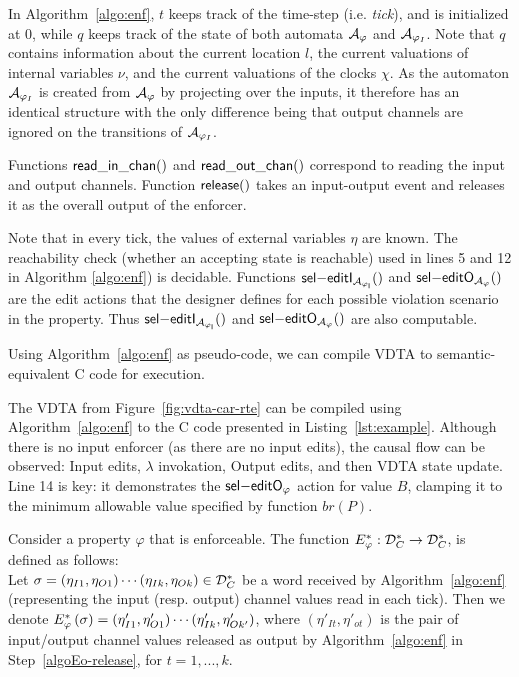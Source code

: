 In Algorithm~\ref{algo:enf}, $t$ keeps track of the time-step (i.e. \emph{tick}), and is initialized at 0, while $q$ keeps track of the state of both automata ${\mathcal A}_{\varphi}$ and ${\mathcal A}_{\varphi_I}$.
Note that $q$ contains information about the current location $l$, the current valuations of internal variables $\nu$, and the current valuations of the clocks $\chi$.
As the automaton ${\mathcal A}_{\varphi_I}$ is created from ${\mathcal A}_{\varphi}$ by projecting over the inputs, it therefore has an identical structure with the only difference being that output channels are ignored on the transitions of ${\mathcal A}_{\varphi_I}$.

Functions $\mathsf{read\_in\_chan}()$ and $\mathsf{read\_out\_chan}()$ correspond to reading the input and output channels.
Function $\mathsf{release}()$ takes an input-output event and releases it as the overall output of the enforcer.

\begin{remark}
	Note that in every tick, the values of external variables $\eta$ are known. 
	The reachability check (whether an accepting state is reachable) used in lines 5 and 12 in Algorithm \ref{algo:enf}) is decidable.   
	Functions $\mathsf{{sel}\relax{-} editI_{{\mathcal A}_{\varphi_{I}}}}()$ and $\mathsf{{sel}\relax{-} editO_{{\mathcal A}_\varphi}}()$ are the edit actions that the designer defines for each possible violation scenario in the property. Thus $\mathsf{{sel}\relax{-} editI_{{\mathcal A}_{\varphi_{I}}}}()$ and $\mathsf{{sel}\relax{-} editO_{{\mathcal A}_\varphi}}()$ are also computable.   
\end{remark}



Using Algorithm~\ref{algo:enf} as pseudo-code, we can compile \ac{VDTA} to semantic-equivalent C code for execution.


\begin{example}
	The \ac{VDTA} from Figure~\ref{fig:vdta-car-rte} can be compiled using Algorithm~\ref{algo:enf} to the C code presented in Listing~\ref{lst:example}.
	Although there is no input enforcer (as there are no input edits), the causal flow can be observed: Input edits, $\lambda$ invokation, Output edits, and then \ac{VDTA} state update.
	Line 14 is key: it demonstrates the $\mathsf{{sel}\relax{-} editO_{\varphi}}$ action for value $B$, clamping it to the minimum allowable value specified by function $br\left(P\right)$.
\end{example}

\begin{definition}[$\efalgo$]
	\label{def-algo-ef}
	Consider a property $\varphi$ that is enforceable. 
	The function ${E_{\varphi}^*}:{\mathcal D}_C^*\to{\mathcal D}_C^*$,  is defined as follows:\\
	Let $\sigma = \left(\eta_{I1}, \eta_{O1}\right) \cdots \left(\eta_{Ik}, \eta_{Ok}\right)\in{\mathcal D}_C^*$ be a word received by
	Algorithm~\ref{algo:enf} (representing the input (resp. output) channel values read in each tick). Then we denote
	${E_{\varphi}^*}\left(\sigma\right)=\left(\eta'_{I1}, \eta'_{O1}\right) \cdots \left(\eta'_{Ik}, \eta'_{Ok'}\right)$, where $\left(\eta'_{It},\eta'_{ot}\right)$ is the
	pair of input/output channel values released as output by Algorithm~\ref{algo:enf} in Step~\ref{algoEo-release},
	for $t=1,...,k$.
\end{definition}

